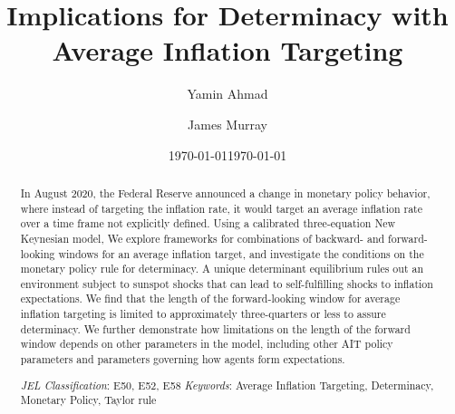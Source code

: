 \documentclass[english,authoryear,12pt]{elsarticle}
\begin{document}
	\begin{frontmatter}
		\title{Implications for Determinacy with Average Inflation Targeting}
		\date{\today}
		\author[1]{Yamin Ahmad}
		\author[2]{James Murray}

		\address[1]{Dept. of Economics, University of Wisconsin - Whitewater, 809 W. Starin Road, Whitewater, WI 53190, USA}
		\address[2]{Dept. of Economics, University of Wisconsin - La Crosse, 1725 State St., La Crosse, WI 54601, USA}

	\date{\today}

	\begin{abstract}
		In August 2020, the Federal Reserve announced a change in monetary policy behavior, where instead of targeting the inflation rate, it would target an average inflation rate over a time frame not explicitly defined. Using a calibrated three-equation New Keynesian model, We explore frameworks for combinations of backward- and forward-looking windows for an average inflation target, and investigate the conditions on the monetary policy rule for determinacy. A unique determinant equilibrium rules out an environment subject to sunspot shocks that can lead to self-fulfilling shocks to inflation expectations. We find that the length of the forward-looking window for average inflation targeting is limited to approximately three-quarters or less to assure determinacy. We further demonstrate how limitations on the length of the forward window depends on other parameters in the model, including other AIT policy parameters and parameters governing how agents form expectations.

		\begin{flushleft}
			{\it JEL Classification}: E50, E52, E58 \newline
			{\it Keywords}: Average Inflation Targeting, Determinacy, Monetary Policy, Taylor rule
		\end{flushleft}
	\end{abstract}

\end{frontmatter}

\renewcommand{\thefootnote}{\arabic{footnote}}%
\setcounter{page}{1}%
\setcounter{footnote}{0}%
\end{document}
